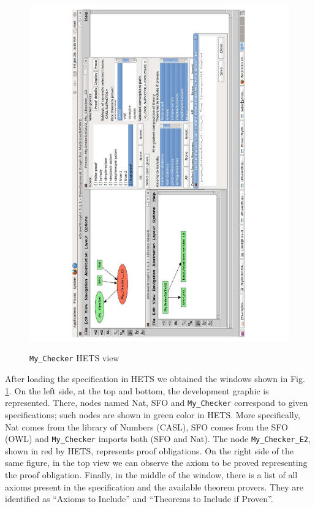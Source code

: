 \begin{figure}
\begin{center}
	\includegraphics[scale=0.5, angle=270]{figure-chapterIV/fig4-39}\\
	\caption{\texttt{My\_Checker} HETS view }
	\label{figure4-39}
\end{center}
\end{figure}


After loading the specification in HETS we obtained the windows shown in Fig. \ref{figure4-39}.  On the left side, at the top and bottom, the development graphic is represented. There, nodes named Nat, SFO and \texttt{My\_Checker} correspond to given specifications; such nodes are shown in green color in HETS. More specifically, Nat comes from the library of Numbers (CASL), SFO comes from the SFO (OWL) and \texttt{My\_Checker} imports both (SFO and Nat). The node \texttt{My\_Checker\_E2}, shown in red by HETS, represents proof obligations. On the right side of the same figure, in the top  view we can observe the axiom to be proved representing the proof obligation. Finally, in the  middle of the  window, there is a list of all axioms present in the specification and the available theorem provers. They are identified as “Axioms to Include” and “Theorems to Include if Proven”.  

